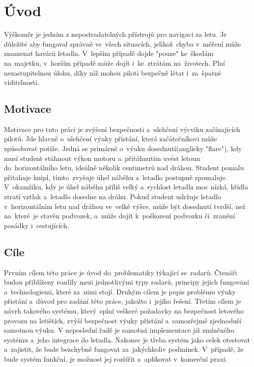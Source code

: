 
\newtheorem{definice}{Definice}

\chapter{Úvod}\label{uvod}
	Výškoměr je jedním z nepostradatelných přístrojů pro navigaci za letu. Je důležité aby fungoval správně ve~všech situacích, jelikož~chyba v~měření může znamenat havárii letadla. V~lepším případě dojde "pouze" ke~škodám na~majetku, v~horším případě může dojít i~ke~ztrátám na~životech. Plní nezastupitelnou úlohu, díky níž mohou piloti bezpečně létat i~za~špatné viditelnosti.
	
	\section{Motivace}\label{uvod::motivace}
		Motivace pro tuto práci je zvýšení bezpečnosti a~ulehčení výcviku začínajících pilotů. Jde hlavně o~ulehčení výuky přistání, která začátečníkovi může způsobovat potíže. Jedná se primárně o~výuku dosednutí(anglicky "flare"), kdy musí student stáhnout výkon motoru a~přitáhnutím uvést letoun do~horizontálního letu, ideálně několik centimetrů nad dráhou. Student pomalu přitahuje knipl, tímto~zvyšuje úhel náběhu a~letadlo postupně zpomaluje. V~okamžiku, kdy je úhel náběhu příliš velký a~rychlost letadla moc nízká, křídla ztratí vztlak a~letadlo dosedne na dráhu. Pokud student udržuje letadlo v~horizontálním letu nad dráhou ve~velké výšce, může být dosednutí tvrdší, než na~které~je stavěn podvozek, a~může dojít k~poškození podvozku či~zranění posádky i~cestujících.
	
	\section{Cíle}\label{uvod::cile}
		Prvním cílem této práce je úvod do~problematiky týkající se~radarů. Čtenáři budou přiblíženy rozdíly mezi jednotlivými typy radarů, principy jejich fungování a~technologiemi, které za~nimi stojí. Druhým cílem je popis problému výuky přistání a~důvod pro zadání této práce, jakožto i~jejího řešení. Třetím cílem je návrh takového systému, který~splní veškeré požadavky na bezpečnost letového provozu na letištích, zvýší bezpečnost výuky přistání a~samozřejmě zjednoduší samotnou výuku. V neposlední řadě je samotná implementace již zmíněného systému a~jeho integrace do letadla. Nakonec je třeba systém jako celek otestovat a~zajistit, že bude bezchybně fungovat za~jakýchkoliv podmínek. V~případě, že bude systém funkční, je možnost jej rozšířit a~aplikovat v~komerční praxi. 

